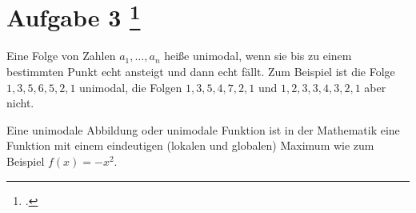 \documentclass{bschlangaul-aufgabe}
\begin{document}
\section{Aufgabe 3
\footcite{examen:46115:2015:09}}

Eine Folge von Zahlen $a_1, \dots, a_n$ heiße unimodal, wenn sie bis zu
einem bestimmten Punkt echt ansteigt und dann echt fällt. Zum Beispiel
ist die Folge $1,3,5,6,5,2,1$ unimodal, die Folgen $1,3,5,4,7,2,1$ und
$1,2,3,3,4,3,2,1$ aber nicht.

\begin{liExkurs}
Eine unimodale Abbildung oder unimodale Funktion ist in der Mathematik
eine Funktion mit einem eindeutigen (lokalen und globalen) Maximum wie
zum Beispiel $f(x)=-x^{2}$.
\end{liExkurs}
\end{document}
